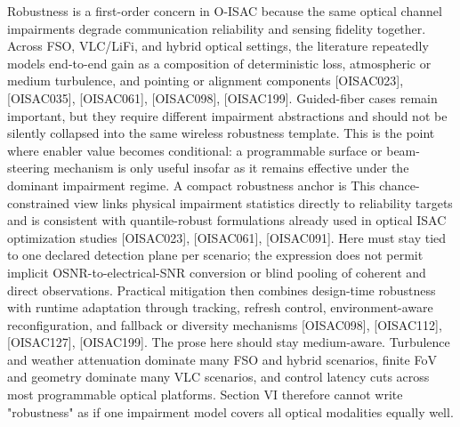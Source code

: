 {}Robustness is a first-order concern in O-ISAC because the same optical channel impairments degrade communication reliability and sensing fidelity together. Across FSO, VLC/LiFi, and hybrid optical settings, the literature repeatedly models end-to-end gain as a composition of deterministic loss, atmospheric or medium turbulence, and pointing or alignment components [O\markdownRendererUnderscore{}ISAC\markdownRendererUnderscore{}023], [O\markdownRendererUnderscore{}ISAC\markdownRendererUnderscore{}035], [O\markdownRendererUnderscore{}ISAC\markdownRendererUnderscore{}061], [O\markdownRendererUnderscore{}ISAC\markdownRendererUnderscore{}098], [O\markdownRendererUnderscore{}ISAC\markdownRendererUnderscore{}199]. Guided-fiber cases remain important, but they require different impairment abstractions and should not be silently collapsed into the same wireless robustness template. This is the point where enabler value becomes conditional: a programmable surface or beam-steering mechanism is only useful insofar as it remains effective under the dominant impairment regime.\markdownRendererParagraphSeparator
{}A compact robustness anchor is\markdownRendererParagraphSeparator
{}\markdownRendererSoftLineBreak
{}\markdownRendererParagraphSeparator
{}This chance-constrained view links physical impairment statistics directly to reliability targets and is consistent with quantile-robust formulations already used in optical ISAC optimization studies [O\markdownRendererUnderscore{}ISAC\markdownRendererUnderscore{}023], [O\markdownRendererUnderscore{}ISAC\markdownRendererUnderscore{}061], [O\markdownRendererUnderscore{}ISAC\markdownRendererUnderscore{}091]. Here \markdownRendererInlineMath{\gamma} must stay tied to one declared detection plane per scenario; the expression does not permit implicit OSNR-to-electrical-SNR conversion or blind pooling of coherent and direct observations. Practical mitigation then combines design-time robustness with runtime adaptation through tracking, refresh control, environment-aware reconfiguration, and fallback or diversity mechanisms [O\markdownRendererUnderscore{}ISAC\markdownRendererUnderscore{}098], [O\markdownRendererUnderscore{}ISAC\markdownRendererUnderscore{}112], [O\markdownRendererUnderscore{}ISAC\markdownRendererUnderscore{}127], [O\markdownRendererUnderscore{}ISAC\markdownRendererUnderscore{}199].\markdownRendererParagraphSeparator
{}The prose here should stay medium-aware. Turbulence and weather attenuation dominate many FSO and hybrid scenarios, finite FoV and geometry dominate many VLC scenarios, and control latency cuts across most programmable optical platforms. Section VI therefore cannot write "robustness" as if one impairment model covers all optical modalities equally well.\markdownRendererParagraphSeparator
